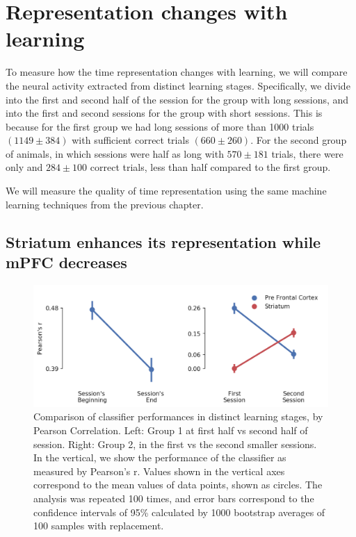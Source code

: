 \chapter{Representation changes with learning}

To measure how the time representation changes with learning, we will compare the neural activity extracted from distinct learning stages. Specifically, we divide into the first and second half of the session for the group with long sessions, and into the first and second sessions for the group with short sessions. This is because for the first group we had long sessions of more than 1000 trials $(1149 \pm 384)$ with sufficient correct trials $(660 \pm 260)$. For the second group of animals, in which sessions were half as long with $570 \pm 181$ trials, there were only and $284\pm 100$ correct trials, less than half compared to the first group.

We will measure the quality of time representation using the same machine learning techniques from the previous chapter.

\section{Striatum enhances its representation while mPFC decreases}

\begin{figure}[ht]
    \centering
    \includegraphics[width=\textwidth]{figures/pearson_comparison_before_after_learning.png}
    \caption[Comparison of classifier performances in distinct learning stages, by Pearson Correlation]{Comparison of classifier performances in distinct learning stages, by Pearson Correlation. Left: Group 1 at first half vs second half of session. Right: Group 2, in the first vs the second smaller sessions. In the vertical, we show the performance of the classifier as measured by Pearson's r. Values shown in the vertical axes correspond to the mean values of data points, shown as circles. The analysis was repeated 100 times, and error bars correspond to the confidence intervals of 95\% calculated by 1000 bootstrap averages of 100 samples with replacement.}
    \label{fig:time_representation_str_pfc}
\end{figure}
